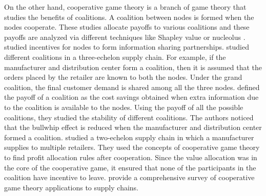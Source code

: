 On the other hand, cooperative game theory is a branch of game theory
that studies the benefits of coalitions. A coalition between nodes
is formed when the nodes cooperate. These studies allocate payoffs to
various coalitions and these payoffs are analyzed via different
techniques like Shapley value \citep{shapley:1997} or nucleolus
\citep{schmeidler:1969}. \citet{raghunathan:2003} studied incentives
for nodes to form information sharing
partnerships. \citet{leng:parlar:2009}  studied different
coalitions in a three-echelon supply chain. For example, if the
manufacturer and distribution center form a coalition, then it is
assumed that the orders placed by the retailer are known to both the
nodes. Under the grand coalition, the final customer demand is shared
among all the three nodes.  \citet{leng:parlar:2009} defined the
payoff of a coalition as 
the cost savings obtained when  extra information due to the
coalition is available to the nodes. Using the
payoff of all the possible coalitions, they studied the stability of
different coalitions.  The authors  noticed that the bullwhip effect
is reduced when the 
manufacturer and distribution center formed a
coalition. \citet{bartholdi:ziya:2005} studied a two-echelon supply chain
in which a manufacturer supplies to multiple retailers. They used the
concepts of cooperative game theory to find profit allocation rules
after cooperation. Since the value allocation was in the core of the
cooperative game, it ensured that none of the participants in the
coalition have incentive to leave.  
\citet{nagarajan:sosic:2008} provide a comprehensive survey of
cooperative game theory applications to supply chains. 


